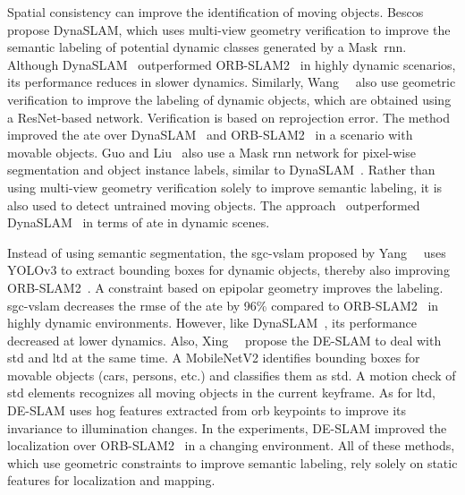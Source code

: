 Spatial consistency can improve the identification of moving objects.
Bescos~\etal~\cite{bescos:ral:2018} propose DynaSLAM,
which uses multi-view geometry verification to improve the
semantic labeling of potential dynamic classes generated by a Mask~\gls{rnn}.
Although DynaSLAM~\cite{bescos:ral:2018} outperformed
ORB-SLAM2~\cite{mur-artal-tardos:tro:2017} in highly dynamic scenarios,
its performance reduces in slower dynamics.
Similarly, Wang~\etal~\cite{wang:icra:2019} also use geometric verification
to improve the labeling of dynamic objects, which are obtained using
a ResNet-based network. Verification is based on reprojection error.
The method~\cite{wang:icra:2019} improved the \gls{ate} over
DynaSLAM~\cite{bescos:ral:2018} and ORB-SLAM2~\cite{mur-artal-tardos:tro:2017}
in a scenario with movable objects.
Guo and Liu~\cite{guo-liu:robio:2021} also use a
Mask \gls{rnn} network for pixel-wise segmentation and object instance labels,
similar to DynaSLAM~\cite{bescos:ral:2018}.
Rather than using multi-view geometry verification solely to improve
semantic labeling, it is also used to detect untrained moving objects.
The approach~\cite{guo-liu:robio:2021} outperformed
DynaSLAM~\cite{bescos:ral:2018} in terms of \gls{ate} in dynamic scenes.

Instead of using semantic segmentation, the \gls{sgc-vslam} proposed by
Yang~\etal~\cite{yang:sensors:2020} uses YOLOv3 to extract bounding boxes
for dynamic objects, thereby also improving
ORB-SLAM2~\cite{mur-artal-tardos:tro:2017}.
A constraint based on epipolar geometry improves the labeling.
\gls{sgc-vslam} decreases the \gls{rmse} of the \gls{ate} by 96\%
compared to ORB-SLAM2~\cite{mur-artal-tardos:tro:2017}
in highly dynamic environments.
However, like DynaSLAM~\cite{bescos:ral:2018},
its performance decreased at lower dynamics.
Also, Xing~\etal~\cite{xing:jfr:2022} propose the DE-SLAM to deal with
\gls{std} and \gls{ltd} at the same time.
A MobileNetV2 identifies bounding boxes for movable objects
(cars, persons, etc.) and classifies them as \gls{std}.
A motion check of \gls{std} elements recognizes all moving objects
in the current keyframe. As for \gls{ltd}, DE-SLAM uses \gls{hog} features
extracted from \gls{orb} keypoints to improve
its invariance to illumination changes.
In the experiments, DE-SLAM improved the localization over
ORB-SLAM2~\cite{mur-artal-tardos:tro:2017} in a changing environment.
All of these methods, which use geometric constraints
to improve semantic labeling, rely solely on static features
for localization and mapping.

